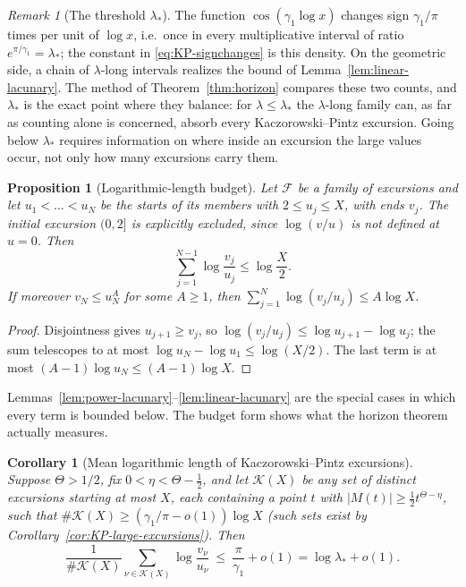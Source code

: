 \documentclass[11pt]{amsart}
\numberwithin{equation}{section}
\theoremstyle{plain}
\newtheorem{proposition}[theorem]{Proposition}
\newtheorem{corollary}[theorem]{Corollary}
\theoremstyle{definition}
\theoremstyle{remark}
\newtheorem{remark}[theorem]{Remark}
\newcommand{\F}{\mathcal{F}}
\begin{document}
\begin{remark}[The threshold $\lambda_*$]
\label{rem:lambda-star}
The function $\cos(\gamma_1\log x)$ changes sign $\gamma_1/\pi$ times per
unit of $\log x$, i.e.\ once in every multiplicative interval of ratio
$e^{\pi/\gamma_1}=\lambda_*$; the constant in \eqref{eq:KP-signchanges} is
this density. On the geometric side, a chain of $\lambda$-long intervals
realizes the bound of Lemma~\ref{lem:linear-lacunary}. The method of
Theorem~\ref{thm:horizon} compares these two counts, and $\lambda_*$ is the
exact point where they balance: for $\lambda\le\lambda_*$ the $\lambda$-long
family can, as far as counting alone is concerned, absorb every
Kaczorowski--Pintz excursion. Going below $\lambda_*$ requires information
on where inside an excursion the large values occur, not only how many
excursions carry them.
\end{remark}

\begin{proposition}[Logarithmic-length budget]
\label{prop:log-budget}
Let $\F$ be a family of excursions and let $u_1<\dots<u_N$ be the starts of
its members with $2\le u_j\le X$, with ends $v_j$.  The initial excursion
$(0,2]$ is explicitly excluded, since $\log(v/u)$ is not defined at
$u=0$.  Then
\[
\sum_{j=1}^{N-1}\log\frac{v_j}{u_j}\le\log\frac X2 .
\]
If moreover $v_N\le u_N^A$ for some $A\ge1$, then
$\sum_{j=1}^{N}\log(v_j/u_j)\le A\log X$.
\end{proposition}

\begin{proof}
Disjointness gives $u_{j+1}\ge v_j$, so
$\log(v_j/u_j)\le\log u_{j+1}-\log u_j$; the sum telescopes to at most
$\log u_N-\log u_1\le\log(X/2)$. The last term is at most
$(A-1)\log u_N\le(A-1)\log X$.
\end{proof}

Lemmas~\ref{lem:power-lacunary}--\ref{lem:linear-lacunary} are the special
cases in which every term is bounded below. The budget form shows what the
horizon theorem actually measures.

\begin{corollary}[Mean logarithmic length of Kaczorowski--Pintz excursions]
\label{cor:KP-mean-log-length}
Suppose $\Theta>1/2$, fix $0<\eta<\Theta-\frac12$, and let $\mathcal K(X)$
be any set of distinct excursions starting at most $X$, each containing a
point $t$ with $|M(t)|\ge\frac12t^{\Theta-\eta}$, such that
$\#\mathcal K(X)\ge(\gamma_1/\pi-o(1))\log X$ (such sets exist by
Corollary~\ref{cor:KP-large-excursions}). Then
\[
\frac1{\#\mathcal K(X)}\sum_{\nu\in\mathcal K(X)}\log\frac{v_\nu}{u_\nu}
\ \le\ \frac{\pi}{\gamma_1}+o(1)=\log\lambda_*+o(1).
\]
\end{corollary}
\end{document}

